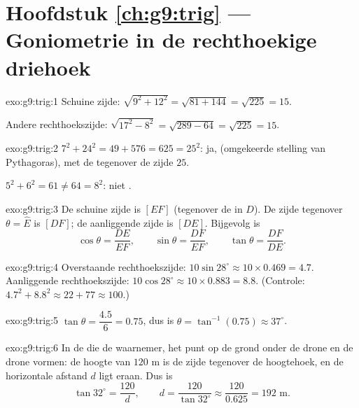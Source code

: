 \section*{Hoofdstuk \ref{ch:g9:trig} --- Goniometrie in de rechthoekige driehoek}

\begin{solution}{exo:g9:trig:1}
Schuine zijde: $\sqrt{9^2 + 12^2} = \sqrt{81 + 144} = \sqrt{225} = 15$.

Andere rechthoekszijde: $\sqrt{17^2 - 8^2} = \sqrt{289 - 64} = \sqrt{225} = 15$.
\end{solution}

\begin{solution}{exo:g9:trig:2}
$7^2 + 24^2 = 49 + 576 = 625 = 25^2$: ja,  (omgekeerde stelling van
Pythagoras), met de  tegenover de zijde $25$.

$5^2 + 6^2 = 61 \neq 64 = 8^2$: niet .
\end{solution}

\begin{solution}{exo:g9:trig:3}
De schuine zijde is $[EF]$ (tegenover de  in $D$). De zijde tegenover
$\theta = \widehat E$ is $[DF]$; de aanliggende zijde is $[DE]$. Bijgevolg is
\[
\cos\theta = \frac{DE}{EF}, \qquad
\sin\theta = \frac{DF}{EF}, \qquad
\tan\theta = \frac{DF}{DE}.
\]
\end{solution}

\begin{solution}{exo:g9:trig:4}
Overstaande rechthoekszijde: $10 \sin 28^\circ \approx 10 \times 0.469 = 4.7$.
Aanliggende rechthoekszijde: $10 \cos 28^\circ \approx 10 \times 0.883 = 8.8$.
(Controle: $4.7^2 + 8.8^2 \approx 22 + 77 \approx 100$.)
\end{solution}

\begin{solution}{exo:g9:trig:5}
$\tan\theta = \dfrac{4.5}{6} = 0.75$, dus is
$\theta = \tan^{-1}(0.75) \approx 37^\circ$.
\end{solution}

\begin{solution}{exo:g9:trig:6}
In de  die de waarnemer, het punt op de grond onder de drone
en de drone vormen: de hoogte van $120$ m is de zijde tegenover de hoogtehoek, en
de horizontale afstand $d$ ligt eraan. Dus is
\[
\tan 32^\circ = \frac{120}{d},
\qquad
d = \frac{120}{\tan 32^\circ} \approx \frac{120}{0.625} = 192 \text{ m}.
\]
\end{solution}

